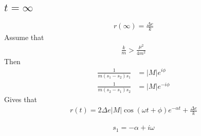\documentclass[norsk, 12pt]{article}
\begin{document}
\subsection{$t=\infty$}
\begin{align*}
	r(\infty) = \frac{\Delta e}{k}
\end{align*}
Assume that
\begin{align*}
	\frac{k}{m} > \frac{\mu^2}{4m^2}
\end{align*}
Then
\begin{align*}
	\frac{1}{m(s_1-s_2)s_1} &= |M|e^{i\phi}\\
	\frac{1}{m(s_2-s_1)s_2} &= |M|e^{-i\phi}
\end{align*}
Gives that
\begin{align*}
	r(t) = 2\Delta e |M| \cos(\omega t + \phi)e^{-\alpha t} + \frac{\Delta e}{k}
\end{align*}

\begin{align*}
	s_1 = -\alpha + i\omega
\end{align*}
\end{document}
